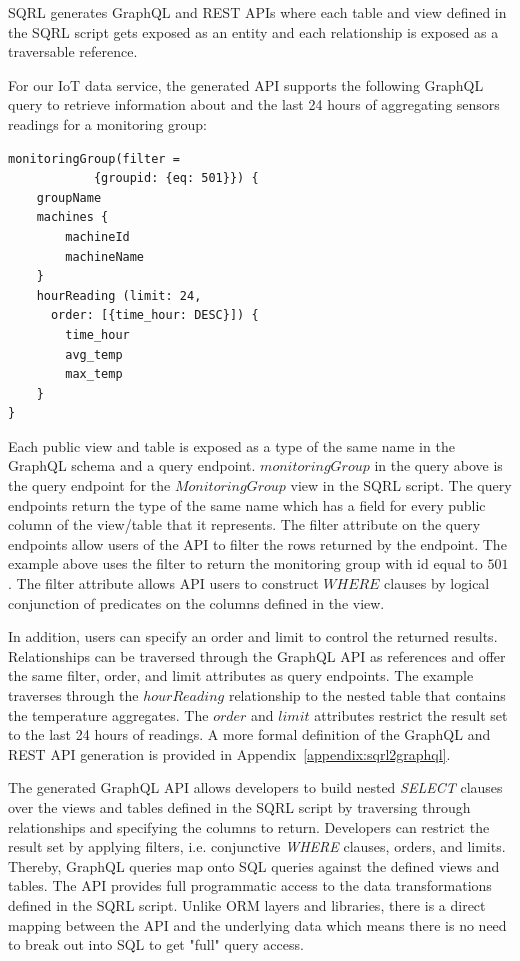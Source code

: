 \documentclass[	DIV=calc,%
							paper=letter,%
							fontsize=11pt,%
							twocolumn]{scrartcl}	 					%
\begin{document}
SQRL generates GraphQL and REST APIs where each table and view defined in the SQRL script gets exposed as an entity and each relationship is exposed as a traversable reference.

For our IoT data service, the generated API supports the following GraphQL query to retrieve information about and the last 24 hours of aggregating sensors readings for a monitoring group:

\begin{lstlisting}
monitoringGroup(filter =
            {groupid: {eq: 501}}) {
    groupName
    machines {
        machineId
        machineName
    }
    hourReading (limit: 24,
      order: [{time_hour: DESC}]) {
        time_hour
        avg_temp
        max_temp
    }
}
\end{lstlisting}

Each public view and table is exposed as a type of the same name in the GraphQL schema and a query endpoint. $monitoringGroup$ in the query above is the query endpoint for the $MonitoringGroup$ view in the SQRL script. The query endpoints return the type of the same name which has a field for every public column of the view/table that it represents.
The filter attribute on the query endpoints allow users of the API to filter the rows returned by the endpoint. The example above uses the filter to return the monitoring group with id equal to $501$. The filter attribute allows API users to construct $WHERE$ clauses by logical conjunction of predicates on the columns defined in the view.

In addition, users can specify an order and limit to control the returned results. Relationships can be traversed through the GraphQL API as references and offer the same filter, order, and limit attributes as query endpoints. The example traverses through the $hourReading$ relationship to the nested table that contains the temperature aggregates. The $order$ and $limit$ attributes restrict the result set to the last 24 hours of readings. A more formal definition of the GraphQL and REST API generation is provided in Appendix~\ref{appendix:sqrl2graphql}.

The generated GraphQL API allows developers to build nested \emph{SELECT} clauses over the views and tables defined in the SQRL script by traversing through relationships and specifying the columns to return. Developers can restrict the result set by applying filters, i.e. conjunctive \emph{WHERE} clauses, orders, and limits. Thereby, GraphQL queries map onto SQL queries against the defined views and tables. The API provides full programmatic access to the data transformations defined in the SQRL script. Unlike ORM layers and libraries, there is a direct mapping between the API and the underlying data which means there is no need to break out into SQL to get "full" query access.
\end{document}
